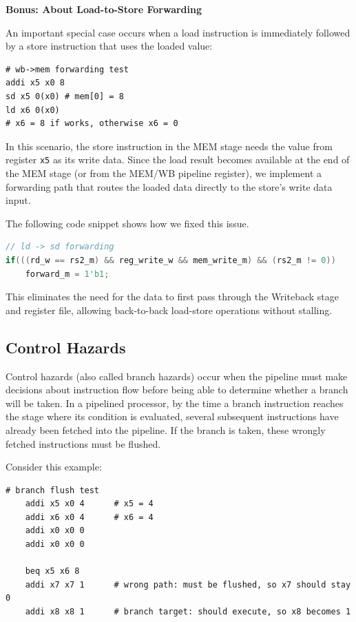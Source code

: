 \documentclass[journal]{IEEEtran}
\begin{document}
\begin{tcolorbox}
    \textbf{Bonus: About Load-to-Store Forwarding}

    An important special case occurs when a load instruction is immediately
    followed by a store instruction that uses the loaded value:

    \begin{lstlisting}[language=RISCV]
# wb->mem forwarding test
addi x5 x0 8
sd x5 0(x0) # mem[0] = 8
ld x6 0(x0) 
# x6 = 8 if works, otherwise x6 = 0
\end{lstlisting}

    In this scenario, the store instruction in the MEM stage needs the value
    from register \texttt{x5} as its write data. Since the load result becomes
    available at the end of the MEM stage (or from the MEM/WB pipeline
    register), we implement a forwarding path that routes the loaded data
    directly to the store's write data input.

    The following code snippet shows how we fixed this issue.

    \begin{lstlisting}[language=verilog]
// ld -> sd forwarding
if(((rd_w == rs2_m) && reg_write_w && mem_write_m) && (rs2_m != 0))
    forward_m = 1'b1;
\end{lstlisting}

    This eliminates the need for the data to first pass through the Writeback
    stage and register file, allowing back-to-back load-store operations without
    stalling.
\end{tcolorbox}

\subsection{Control Hazards}

Control hazards (also called branch hazards) occur when the pipeline must make
decisions about instruction flow before being able to determine whether a branch will be
taken. In a pipelined processor, by the time a branch instruction reaches the
stage where its condition is evaluated, several subsequent instructions have
already been fetched into the pipeline. If the branch is taken, these
wrongly fetched instructions must be flushed.

Consider this example:
\begin{lstlisting}[language=RISCV]
    # branch flush test
    addi x5 x0 4      # x5 = 4
    addi x6 x0 4      # x6 = 4
    addi x0 x0 0
    addi x0 x0 0  

    beq x5 x6 8      
    addi x7 x7 1      # wrong path: must be flushed, so x7 should stay 0
    addi x8 x8 1      # branch target: should execute, so x8 becomes 1

\end{lstlisting}
\end{document}
